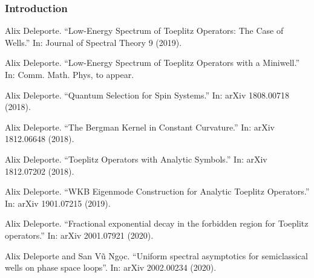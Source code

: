 \documentclass[mathserif]{beamer}
\begin{document}
      \begin{frame}
        \frametitle{Introduction}
        {\footnotesize
        \begin{description}
        \item<1>[{[D. 2019]}] Alix Deleporte. “Low-Energy Spectrum of Toeplitz Operators: The Case
of Wells.” In: Journal of Spectral Theory 9 (2019).
\item<1-2> [{[D. 2020?]}] Alix Deleporte. “Low-Energy Spectrum of Toeplitz Operators with a
Miniwell.” In: Comm. Math. Phys, to appear.
\item<1>[{[D. 2018a++]}] Alix Deleporte. “Quantum Selection for Spin Systems.” In: arXiv
1808.00718 (2018).
\item<1>[{[D. 2018b++]}] Alix Deleporte. “The Bergman Kernel in Constant Curvature.” In:
arXiv 1812.06648 (2018).
\item<1-2>[{[D. 2018c++]}] Alix Deleporte. “Toeplitz Operators with Analytic Symbols.” In: arXiv
1812.07202 (2018).
\item<1>[{[D. 2019++]}] Alix Deleporte. “WKB Eigenmode Construction for Analytic Toeplitz
  Operators.” In: arXiv 1901.07215 (2019).
  \item<1-2>[{[D. 2020a++]}] Alix Deleporte. ``Fractional exponential
    decay in the forbidden region for Toeplitz operators.'' In: arXiv
    2001.07921 (2020).
    \item<1>[{[DV 2020b++]}] Alix Deleporte and San Vũ Ng\d{o}c. ``Uniform spectral asymptotics for semiclassical
wells on phase space loops''. In: arXiv 2002.00234 (2020).
        \end{description}}
    \end{frame}



    
\end{document}
